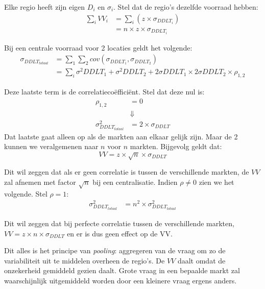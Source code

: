 Elke regio heeft zijn eigen $D_i$ en $\sigma_i$. Stel dat de regio's dezelfde voorraad hebben:
\begin{align*}
    \sum_i VV_i &= \sum_i (z \times \sigma_{DDLT_i}) \\
    &= n \times z \times \sigma_{DDLT_i}
\end{align*}

Bij een centrale voorraad voor 2 locaties geldt het volgende:
\begin{align*}
    \sigma_{DDLT_{totaal}} &= \sum_1 \sum_2 cov(\sigma_{DDLT_1}, \sigma_{DDLT_2})\\
    &= \sum_i \sigma^2 DDLT_1 + \sigma^2 DDLT_2 + 2 \sigma DDLT_1 \times 2 \sigma DDLT_2 \times \rho_{1,2}
\end{align*}

Deze laatste term is de correlatieco\"effici\"ent. Stel dat deze nul is:
\begin{align*}
    \rho_{1,2} &= 0 \\
    &\Downarrow \\
    \sigma^2_{DDLT_{totaal}} &= 2 \times \sigma_{DDLT}
\end{align*}
Dat laatste gaat alleen op als de markten aan elkaar gelijk zijn. Maar de 2 kunnen we veralgemenen naar $n$ voor $n$ markten. Bijgevolg geldt dat:
\begin{equation*}
    VV = z \times \sqrt{n} \times \sigma_{DDLT}
\end{equation*}

Dit wil zeggen dat als er geen correlatie is tussen de verschillende markten, de $VV$ zal afnemen met factor $\sqrt{n}$ bij een centralisatie. Indien $\rho \ne 0$ zien we het volgende. Stel $\rho = 1$:
\begin{align*}
    \sigma^2_{DDLT_{totaal}} &= n^2 \times \sigma^2_{DDLT_{totaal}}
\end{align*}

Dit wil zeggen dat bij perfecte correlatie tussen de verschillende markten, $VV = z \times n \times \sigma_{DDLT}$ en er is dus geen effect op de VV.

Dit alles is het principe van \textit{pooling}: aggregeren van de vraag om zo de variabiliteit uit te middelen overheen de regio's. De $VV$ daalt omdat de onzekerheid gemiddeld gezien daalt. Grote vraag in een bepaalde markt zal waarschijnlijk uitgemiddeld worden door een kleinere vraag ergens anders.
